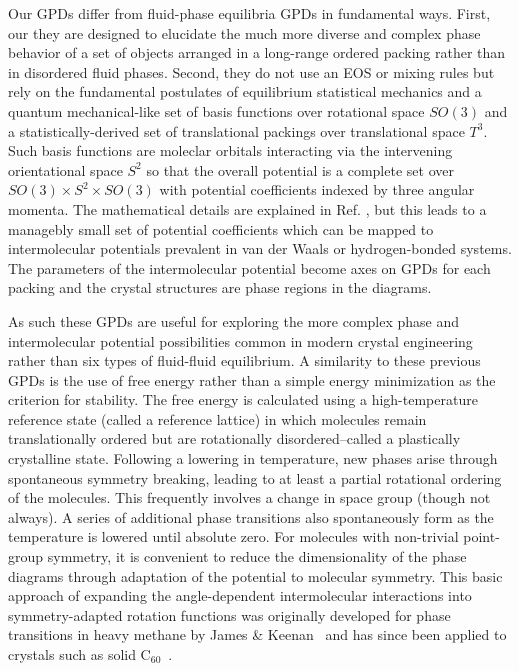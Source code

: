 \documentclass[preprint]{revtex4}
\begin{document}
Our GPDs differ from fluid-phase equilibria GPDs in fundamental ways.  First, our they are designed to elucidate the much more diverse and complex phase behavior of a set of objects arranged in a long-range ordered packing rather than in disordered fluid phases.  Second, they do not use an EOS or mixing rules but rely on the fundamental postulates of equilibrium statistical mechanics and a quantum mechanical-like set of basis functions over rotational space $SO(3)$ and a statistically-derived set of translational packings over translational space $T^3$.  Such basis functions are moleclar orbitals interacting via the intervening orientational space $S^2$ so that the overall potential is a complete set over $SO(3) \times S^2 \times SO(3)$ with potential coefficients indexed by three angular momenta.  The mathematical details are explained in Ref. \cite{Mettes04}, but this leads to a managebly small set of potential coefficients which can be mapped to intermolecular potentials prevalent in van der Waals or hydrogen-bonded systems\cite{Mettes04}. The parameters of the
intermolecular potential become axes on GPDs for each packing and
the crystal structures are phase regions in the diagrams.  

As such these GPDs are useful for exploring the more complex phase and intermolecular potential possibilities common in modern crystal engineering rather than six types of fluid-fluid equilibrium. A similarity to these previous GPDs is the use of free energy rather than a simple energy minimization as the criterion for stability. The free energy is calculated using a high-temperature reference state (called a reference lattice) in which molecules remain translationally ordered but are rotationally disordered--called a plastically crystalline state.  Following a lowering in temperature, new phases arise through spontaneous symmetry breaking, leading to at least a partial rotational ordering of the molecules.  This frequently involves a change in space group (though not always).  A series of additional phase transitions also spontaneously form as the temperature is lowered until absolute zero. For molecules with non-trivial point-group symmetry, it is convenient to reduce the dimensionality of the phase diagrams through adaptation of the potential to molecular symmetry. This basic approach of expanding the angle-dependent intermolecular interactions into symmetry-adapted rotation functions was originally developed for phase transitions in heavy methane by James & Keenan~\cite{James95} and has since been applied to crystals such as solid C$_{60}$~\cite{Michel92,Lamoen99}. 
\end{document}
